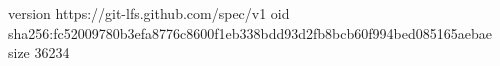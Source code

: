 version https://git-lfs.github.com/spec/v1
oid sha256:fc52009780b3efa8776c8600f1eb338bdd93d2fb8bcb60f994bed085165aebae
size 36234
